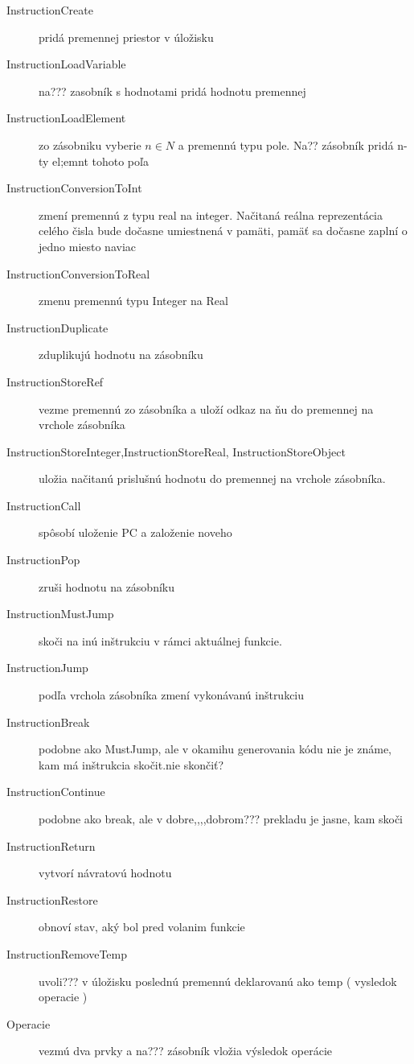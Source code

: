 \begin{description} %
\item[InstructionCreate] pridá premennej priestor v úložisku
\item[InstructionLoadVariable] na??? zasobník s hodnotami pridá hodnotu premennej
\item[InstructionLoadElement] zo zásobniku vyberie $n \in N$ a premennú typu pole. Na?? zásobník pridá n-ty el;emnt tohoto poľa
\item[InstructionConversionToInt] zmení premennú z typu real na integer. Načitaná reálna reprezentácia celého čisla bude dočasne umiestnená v pamäti, pamäť sa dočasne zaplní o jedno miesto naviac %
\item[InstructionConversionToReal] zmenu premennú typu Integer na Real
\item[InstructionDuplicate] zduplikujú hodnotu na zásobníku
\item[InstructionStoreRef] vezme premennú zo zásobníka a uloží odkaz na ňu do premennej na vrchole zásobníka %
\item[InstructionStoreInteger,InstructionStoreReal, InstructionStoreObject] uložia načitanú prislušnú hodnotu do premennej na vrchole zásobníka.
\item[InstructionCall] spôsobí uloženie PC %
a založenie noveho
\item[InstructionPop ] zruši hodnotu na zásobníku
\item[InstructionMustJump] skoči na inú inštrukciu v rámci aktuálnej funkcie.
\item[InstructionJump] podľa vrchola zásobníka zmení vykonávanú inštrukciu
\item[InstructionBreak] podobne ako MustJump, ale v okamihu generovania kódu nie je známe, kam má inštrukcia skočit.nie skončiť?
\item[InstructionContinue ] podobne ako break, ale v dobre,,,,dobrom??? prekladu je jasne, kam skoči
\item[InstructionReturn] vytvorí návratovú hodnotu
\item [InstructionRestore] obnoví stav, aký bol pred volanim funkcie
\item [InstructionRemoveTemp] uvoli??? v úložisku poslednú premennú deklarovanú ako temp ( vysledok operacie )
\item [Operacie] vezmú dva prvky a na??? zásobník vložia výsledok operácie
\begin{description}

\end{description}
\end{description}
